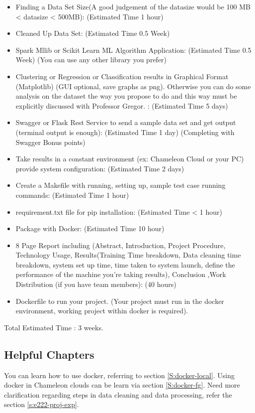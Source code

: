\begin{itemize}
\item Finding a Data Set Size(A good judgement of the datasize would
  be 100 MB < datasize < 500MB): (Estimated Time 1 hour)
\item Cleaned Up Data Set: (Estimated Time 0.5 Week)
\item Spark Mllib or Scikit Learn ML Algorithm Application: (Estimated
  Time 0.5 Week) (You can use any other library you prefer)
\item Clustering or Regression or Classification results in Graphical
  Format (Matplotlib) (GUI optional, save graphs as png). Otherwise
  you can do some analysis on the dataset the way you propose to do
  and this way must be explicitly discussed with Professor Gregor. :
  (Estimated Time 5 days)
\item Swagger or Flask  Rest Service  to send  a sample data  set and  get output
  (terminal output is enough): (Estimated Time 1 day) (Completing with Swagger Bonus points)
\item Take results in a constant environment (ex: Chameleon Cloud or
  your PC) provide system configuration: (Estimated Time 2 days)
\item Create a Makefile with running, setting up, sample test case
  running commands: (Estimated Time 1 hour)
\item requirement.txt file for pip installation: (Estimated Time < 1 hour)
\item Package with Docker: (Estimated Time 10 hour)
\item 8 Page Report including (Abstract, Introduction, Project
  Procedure, Technology Usage, Results(Training Time breakdown, Data
  cleaning time breakdown, system set up time, time taken to system
  launch, define the performance of the machine you're taking
  results), Conclusion ,Work Distribution (if you have team members): (40 hours)
\item Dockerfile to run your project. (Your project must run in the
  docker environment, working project within docker is required).
\end{itemize}

Total Estimated Time : 3 weeks.

\subsection{Helpful Chapters}

You can learn how to use docker, referring to section
\ref{S:docker-local}.  Using docker in Chameleon clouds can be learn
via section \ref{S:docker-fg}.  Need more clarification regarding
steps in data cleaning and data processing, refer the section
\ref{s:e222-proj-exp}.

